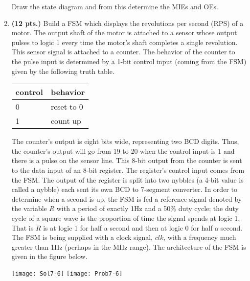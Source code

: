 \begin{enumerate}
        Draw the state diagram and from this determine the MIEs and OEs.

    \item \textbf{ (12 pts.)}
        Build a FSM which displays the revolutions per second
        (RPS) of a motor.  The output shaft of the motor is attached to
        a sensor whose output pulses to logic 1 every time the motor's shaft
        completes a single revolution.  This sensor signal is attached to
        a counter.  The behavior of the counter to the pulse input is determined
        by a 1-bit control input (coming from the FSM) given by the following
        truth table.

        \begin{tabular}{l|l}
            control & behavior      \\ \hline \hline
            0       & reset to 0    \\ \hline
            1       & count up      \\
        \end{tabular}

        The counter's output is eight bits wide, representing two BCD digits.  Thus,
        the counter's output will go from 19 to 20 when the control input is 1
        and there is a pulse on the sensor line.  This 8-bit output from the
        counter is sent to the data input of an 8-bit register.  The register's
        control input comes from the FSM.  The output of the register is split
        into two nybbles (a 4-bit value is called a nybble)
        each sent its own BCD to 7-segment converter.  In order to determine
        when a second is up, the FSM is fed a reference signal denoted by
        the variable $R$ with a period of exactly 1Hz and a 50\% duty cycle;
        the duty cycle of a square wave is the proportion of time the signal
        spends at logic 1.   That is $R$ is at logic 1 for half a second and
        then at logic 0 for half a second.  The FSM is being supplied with a
        clock signal, $clk$, with a frequency much greater than 1Hz (perhaps
        in the MHz range).  The architecture of the FSM is given in
        the figure below.

        \ifshowanswers \texttt{[image: Sol7-6]}
        \else      \texttt{[image: Prob7-6]} \fi


\end{enumerate}

